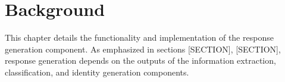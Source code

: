 \chapter{Background}

This chapter details the functionality and implementation of the response generation component. As emphasized in sections [SECTION], [SECTION], response generation depends on the outputs of the information extraction, classification, and identity generation components. 

